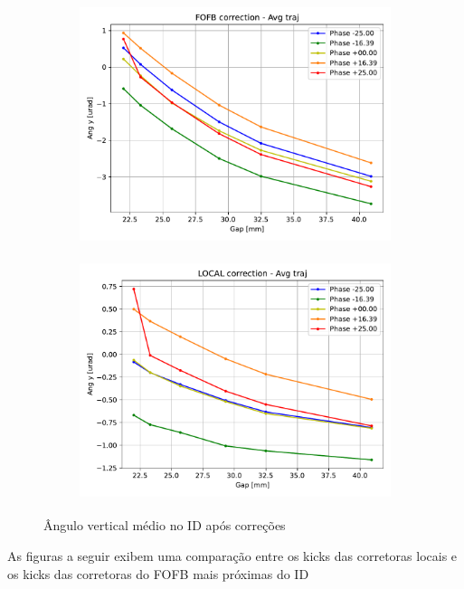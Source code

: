 \documentclass[a4paper,12pt]{article}
\begin{document}
\begin{figure}[H]
\begin{subfigure}{0.5\textwidth}
\includegraphics[width=0.9\linewidth, height=7cm]{figs/FOFB-avg-angy.pdf} 
\label{fig:subimfofbangy}
\end{subfigure}
\begin{subfigure}{0.5\textwidth}
\includegraphics[width=0.9\linewidth, height=7cm]{figs/LOCAL-avg-angy.pdf}
\label{fig:subimlocalangy}
\end{subfigure}
\caption{Ângulo vertical médio no ID após correções}
\label{fig:angy}
\end{figure}

As figuras a seguir exibem uma comparação entre os kicks das corretoras locais e os kicks das corretoras do FOFB mais próximas do ID
\end{document}
